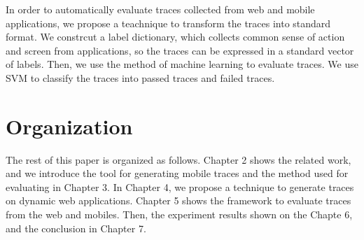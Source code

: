 In order to automatically evaluate traces collected from web and mobile applications,
we propose a teachnique to transform the traces into standard format.
We constrcut a label dictionary, which collects common sense of action and screen from applications,
so the traces can be expressed in a standard vector of labels.
Then, we use the method of machine learning to evaluate traces.
We use SVM to classify the traces into passed traces and failed traces.




\section{Organization}

The rest of this paper is organized as follows.
Chapter 2 shows the related work, 
and we introduce the tool for generating mobile traces and the method used for evaluating in Chapter 3.
In Chapter 4, we propose a technique to generate traces on dynamic web applications.
Chapter 5 shows the framework to evaluate traces from the web and mobiles.
Then, the experiment results shown on the Chapte 6,
and the conclusion in Chapter 7.


